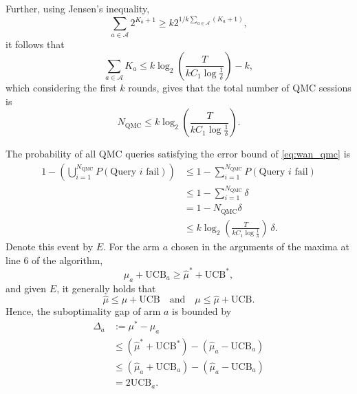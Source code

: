 Further, using Jensen's inequality,
\begin{equation}
    \sum_{a \in \mathcal{A}} 2^{K_a + 1} \geq k 2^{1/k \sum_{a \in \mathcal{A}} (K_a + 1)},
\end{equation}
it follows that
\begin{equation}
    \sum_{a \in \mathcal{A}} K_a
    \leq
    k \log_2 \left(\frac{T}{k C_1 \log \frac{1}{\delta}}\right) -k,
\end{equation}
which considering the first $k$ rounds, gives that the total number of QMC sessions is
\begin{equation}
    N_{\text{QMC}} \leq k \log_2 \left(\frac{T}{k C_1 \log \frac{1}{\delta}}\right).
\end{equation}

The probability of all QMC queries satisfying the error bound of \cref{eq:wan_qmc} is
\begin{equation}
    \begin{aligned}
        1 - \left(\bigcup_{i = 1}^{N_{\text{QMC}}} P(\text{Query } i \text{ fail}) \right)
         & \leq
        1 - \sum_{i = 1}^{N_{\text{QMC}}} P(\text{Query } i \text{ fail})             \\
         & \leq
        1 - \sum_{i = 1}^{N_{\text{QMC}}} \delta                                      \\
         & =
        1 - N_{\text{QMC}} \delta                                                     \\
         & \leq k \log_2 \left(\frac{T}{k C_1 \log \frac{1}{\delta}}\right) \ \delta.
    \end{aligned}
\end{equation}
Denote this event by $E$.
For the arm $a$ chosen in the arguments of the maxima at line 6 of the algorithm,
\begin{equation}
    \hat\mu_a + \text{UCB}_a \geq \hat\mu^* + \text{UCB}^*,
\end{equation}
and given $E$, it generally holds that
\begin{equation}
    \hat\mu \leq \mu + \text{UCB}
    \quad \text{and} \quad
    \mu \leq \hat\mu + \text{UCB}.
\end{equation}
Hence, the suboptimality gap of arm $a$ is bounded by
\begin{equation}
    \begin{aligned}
        \Delta_a & := \mu^* - \mu_a                                             \\
                 & \leq (\hat\mu^* + \text{UCB}^*) - (\hat\mu_a - \text{UCB}_a) \\
                 & \leq (\hat\mu_a + \text{UCB}_a) - (\hat\mu_a - \text{UCB}_a) \\
                 & = 2 \text{UCB}_a.
    \end{aligned}
\end{equation}
